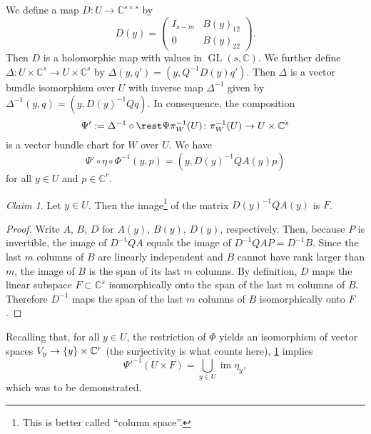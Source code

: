 \documentclass[a4paper]{amsart}
\newcommand{\C}{\mathbb{C}}
\theoremstyle{remark}
\newtheorem{claim}{Claim}[question]
\numberwithin{equation}{question}
\DeclarePairedDelimiter\set{\{}{\}}
\DeclareMathOperator{\GL}{GL}
\DeclareMathOperator{\im}{im}
\begin{document}
\begin{solution}
\begin{solenum}
\item We define a map $D \colon U \to \C^{s\times s}$ by
\[
D(y) = \begin{pmatrix}I_{s-m} & B(y)_{12} \\ 0 & B(y)_{22}\end{pmatrix} .
\]
Then $D$ is a holomorphic map with values in $\GL(s,\C)$. We further define $\Delta \colon U \times \C^s \to U \times \C^s$ by $\Delta(y,q') = (y,Q^{-1}D(y)q')$. Then $\Delta$ is a vector bundle isomorphism over $U$ with inverse map $\Delta^{-1}$ given by $\Delta^{-1}(y,q) = (y,D(y)^{-1}Qq)$. In consequence, the composition
\[
\Psi' := \Delta^{-1} \circ \rest\Psi{\pi_W^{-1}(U)} \colon \pi_W^{-1}(U) \to U \times \C^s
\]
is a vector bundle chart for $W$ over $U$. We have
\[
\Psi' \circ \eta \circ \Phi^{-1}(y,p) = (y,D(y)^{-1}QA(y)p)
\]
for all $y \in U$ and $p \in \C^r$.

\begin{claim}
\label{cl:kernel bundle-2}
Let $y \in U$. Then the image\footnote{This is better called “column space”.} of the matrix $D(y)^{-1}QA(y)$ is $F$.
\end{claim}

\begin{proof}
Write $A$, $B$, $D$ for $A(y)$, $B(y)$, $D(y)$, respectively. Then, because $P$ is invertible, the image of $D^{-1}QA$ equals the image of $D^{-1}QAP = D^{-1}B$. Since the last $m$ columns of $B$ are linearly independent and $B$ cannot have rank larger than $m$, the image of $B$ is the span of its last $m$ columns. By definition, $D$ maps the linear subspace $F \subset \C^s$ isomorphically onto the span of the last $m$ columns of $B$. Therefore $D^{-1}$ maps the span of the last $m$ columns of $B$ isomorphically onto $F$.
\end{proof}

Recalling that, for all $y \in U$, the restriction of $\Phi$ yields an isomorphism of vector spaces $V_y \to \set y \times \C^r$ (the surjectivity is what counts here), \cref{cl:kernel bundle-2} implies
\[
\Psi'^{-1}(U \times F) = \bigcup_{y\in U} \im\eta_y ,
\]
which was to be demonstrated.
\end{solenum}
\end{solution}
\end{document}
